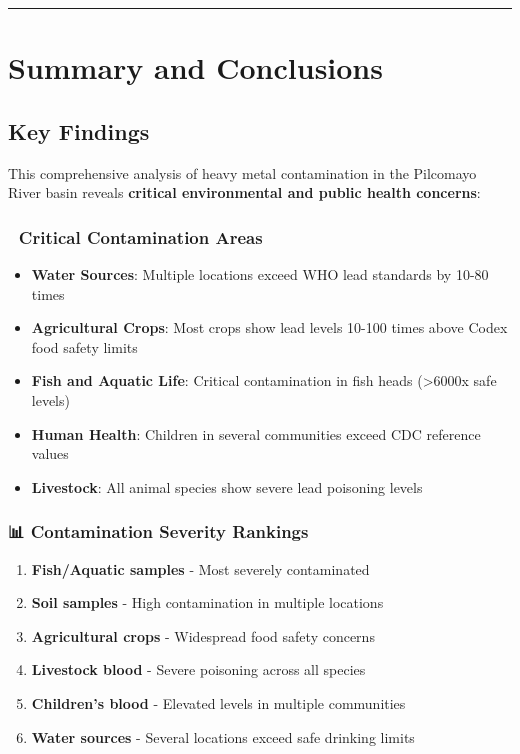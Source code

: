 \documentclass[
]{article}
\providecommand{\tightlist}{%
  \setlength{\itemsep}{0pt}\setlength{\parskip}{0pt}}
\begin{document}
\begin{center}\rule{0.5\linewidth}{0.5pt}\end{center}

\section{Summary and Conclusions}\label{summary-and-conclusions}

\subsection{Key Findings}\label{key-findings}

This comprehensive analysis of heavy metal contamination in the
Pilcomayo River basin reveals \textbf{critical environmental and public
health concerns}:

\subsubsection{\texorpdfstring{🚨 \textbf{Critical Contamination
Areas}}{🚨 Critical Contamination Areas}}\label{critical-contamination-areas}

\begin{itemize}
\tightlist
\item
  \textbf{Water Sources}: Multiple locations exceed WHO lead standards
  by 10-80 times
\item
  \textbf{Agricultural Crops}: Most crops show lead levels 10-100 times
  above Codex food safety limits\\
\item
  \textbf{Fish and Aquatic Life}: Critical contamination in fish heads
  (\textgreater6000x safe levels)
\item
  \textbf{Human Health}: Children in several communities exceed CDC
  reference values
\item
  \textbf{Livestock}: All animal species show severe lead poisoning
  levels
\end{itemize}

\subsubsection{\texorpdfstring{📊 \textbf{Contamination Severity
Rankings}}{📊 Contamination Severity Rankings}}\label{contamination-severity-rankings}

\begin{enumerate}
\def\labelenumi{\arabic{enumi}.}
\tightlist
\item
  \textbf{Fish/Aquatic samples} - Most severely contaminated
\item
  \textbf{Soil samples} - High contamination in multiple locations
\item
  \textbf{Agricultural crops} - Widespread food safety concerns
\item
  \textbf{Livestock blood} - Severe poisoning across all species
\item
  \textbf{Children's blood} - Elevated levels in multiple communities
\item
  \textbf{Water sources} - Several locations exceed safe drinking limits
\end{enumerate}
\end{document}
